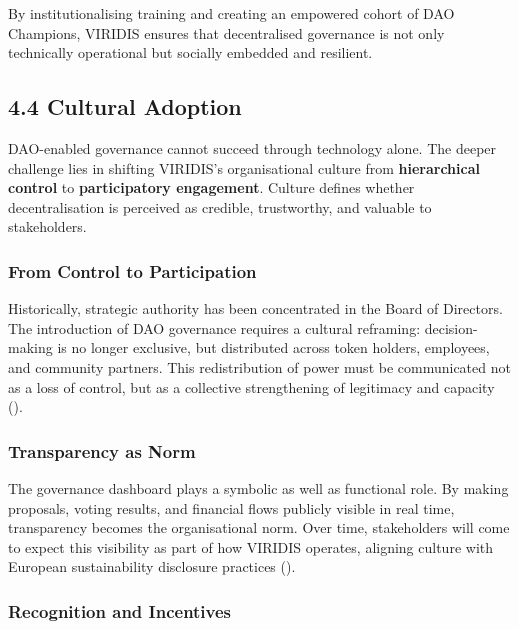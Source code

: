 \documentclass[
  english,
  12pt,
  oneside,
  open=any]{scrbook}
\begin{document}
By institutionalising training and creating an empowered cohort of DAO
Champions, VIRIDIS ensures that decentralised governance is not only
technically operational but socially embedded and resilient.

\subsection{4.4 Cultural Adoption}\label{sec-culture}

DAO-enabled governance cannot succeed through technology alone. The
deeper challenge lies in shifting VIRIDIS's organisational culture from
\textbf{hierarchical control} to \textbf{participatory engagement}.
Culture defines whether decentralisation is perceived as credible,
trustworthy, and valuable to stakeholders.

\subsubsection{From Control to
Participation}\label{from-control-to-participation}

Historically, strategic authority has been concentrated in the Board of
Directors. The introduction of DAO governance requires a cultural
reframing: decision-making is no longer exclusive, but distributed
across token holders, employees, and community partners. This
redistribution of power must be communicated not as a loss of control,
but as a collective strengthening of legitimacy and capacity
().

\subsubsection{Transparency as Norm}\label{transparency-as-norm}

The governance dashboard plays a symbolic as well as functional role. By
making proposals, voting results, and financial flows publicly visible
in real time, transparency becomes the organisational norm. Over time,
stakeholders will come to expect this visibility as part of how VIRIDIS
operates, aligning culture with European sustainability disclosure
practices
().

\subsubsection{Recognition and
Incentives}\label{recognition-and-incentives}
\end{document}
